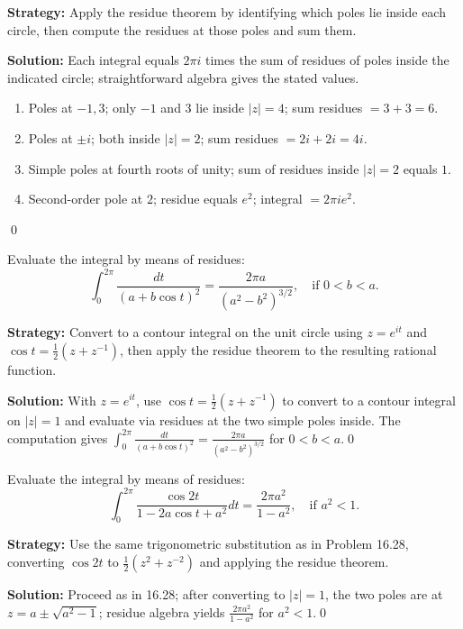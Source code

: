 \noindent\textbf{Strategy:} Apply the residue theorem by identifying which poles lie inside each circle, then compute the residues at those poles and sum them.

\bigskip\noindent\textbf{Solution:}
Each integral equals $2\pi i$ times the sum of residues of poles inside the indicated circle; straightforward algebra gives the stated values.
\begin{enumerate}[label=(\alph*)]
\item Poles at $-1,3$; only $-1$ and $3$ lie inside $|z|=4$; sum residues $=3+3=6$.
\item Poles at $\pm i$; both inside $|z|=2$; sum residues $=2i+2i=4i$.
\item Simple poles at fourth roots of unity; sum of residues inside $|z|=2$ equals $1$.
\item Second-order pole at $2$; residue equals $e^2$; integral $=2\pi i e^2$.
\end{enumerate}\qed


\begin{problembox}
Evaluate the integral by means of residues:
\[ \int_0^{2\pi} \frac{dt}{(a + b \cos t)^2} = \frac{2\pi a}{(a^2 - b^2)^{3/2}}, \quad \text{if } 0 < b < a. \]
\end{problembox}

\noindent\textbf{Strategy:} Convert to a contour integral on the unit circle using \( z = e^{it} \) and \( \cos t = \frac{1}{2}(z + z^{-1}) \), then apply the residue theorem to the resulting rational function.

\bigskip\noindent\textbf{Solution:}
With $z=e^{it}$, use $\cos t=\tfrac12(z+z^{-1})$ to convert to a contour integral on $|z|=1$ and evaluate via residues at the two simple poles inside. The computation gives $\int_0^{2\pi}\frac{dt}{(a+b\cos t)^2}=\frac{2\pi a}{(a^2-b^2)^{3/2}}$ for $0<b<a$.\qed


\begin{problembox}
Evaluate the integral by means of residues:
\[ \int_0^{2\pi} \frac{\cos 2t}{1 - 2a \cos t + a^2} dt = \frac{2\pi a^2}{1 - a^2}, \quad \text{if } a^2 < 1. \]
\end{problembox}

\noindent\textbf{Strategy:} Use the same trigonometric substitution as in Problem 16.28, converting \( \cos 2t \) to \( \frac{1}{2}(z^2 + z^{-2}) \) and applying the residue theorem.

\bigskip\noindent\textbf{Solution:}
Proceed as in 16.28; after converting to $|z|=1$, the two poles are at $z=a\pm\sqrt{a^2-1}$; residue algebra yields $\frac{2\pi a^2}{1-a^2}$ for $a^2<1$.\qed


